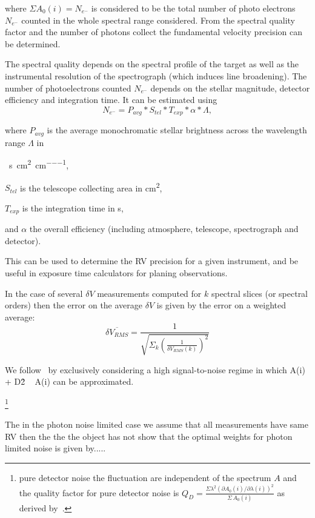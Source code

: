 where \(\Sigma A_0(i) = {N}_{{e}^{-}}\) is considered to be the total number of photo electrons \({N}_{{e}^{-}}\) counted in the whole spectral range considered.
From the spectral quality factor and the number of photons collect the fundamental velocity precision can be determined.

The spectral quality depends on the spectral profile of the target as well as the instrumental resolution of the spectrograph (which induces line broadening). The number of photoelectrons counted  \(N_{e^{-}}\) depends on the stellar magnitude, detector efficiency and integration time. It can be estimated using 
 \begin{equation}
 N_{e^{-}} = P_{avg} * S_{tel} * T_{exp} * \alpha* \Lambda, 
 \end{equation}
 
where \(P_{avg}\) is the average monochromatic stellar brightness 
across the wavelength range \(\Lambda\) in

\si{\photons\per\second\per\centi\metre\squared\per\centi\metre},

\(S_{tel}\) is the telescope collecting area in \si{\centi\metre\squared}, 

\(T_{exp}\) is the integration time in \si{\second}, 

and \(\alpha\) the overall efficiency (including atmosphere, telescope, spectrograph and detector). 

 This can be used to determine the RV precision for a given instrument, and be useful in exposure time calculators for planing observations. 

In the case of several \(\delta  V\) measurements computed for \(k\) spectral slices (or spectral orders) then the error on the average \(\delta V\) is given by the error on a weighted average:
\begin{equation}
\overline{\delta {V}_{RMS}} = \frac{1}{\sqrt{\Sigma_k{(\frac{1}{\delta V_{RMS}(k)})^2}}}
\end{equation}


We follow~\cite{figueira_radial_2016} by exclusively considering  a high signal-to-noise regime in which A(i) + D\^2 ~ A(i) can be approximated.


\footnote{ pure detector noise the fluctuation are independent of the spectrum \(A\) and the quality factor for pure detector noise is \(Q_D = \frac{\Sigma{\lambda^2 {(\partial A_0(i)/\partial \lambda(i))}^{2}}}{\Sigma{\, A_0(i)}}\) as derived by~\cite{Connes1985}. }

The in the photon noise limited case we assume that all measurements have same RV then the the the object has not 
\citet{Connes1985} show that the optimal weights for photon limited noise is given by.....

